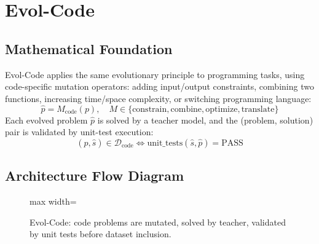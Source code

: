 \newpage
\section{Evol-Code}

\subsection{Mathematical Foundation}
Evol-Code applies the same evolutionary principle to programming tasks, using code-specific mutation operators: adding input/output constraints, combining two functions, increasing time/space complexity, or switching programming language:
\begin{equation}
  \hat{p} = M_{\text{code}}(p),\quad M \in \{\text{constrain}, \text{combine}, \text{optimize}, \text{translate}\}
\end{equation}
Each evolved problem $\hat{p}$ is solved by a teacher model, and the (problem, solution) pair is validated by unit-test execution:
\begin{equation}
  (\hat{p},\hat{s}) \in \mathcal{D}_{\text{code}} \iff \text{unit\_tests}(\hat{s}, \hat{p}) = \text{PASS}
\end{equation}

\subsection{Architecture Flow Diagram}

\begin{figure}[h]
\centering
\begin{adjustbox}{max width=\linewidth}
\end{adjustbox}
\caption{Evol-Code: code problems are mutated, solved by teacher, validated by unit tests before dataset inclusion.}
\end{figure}

